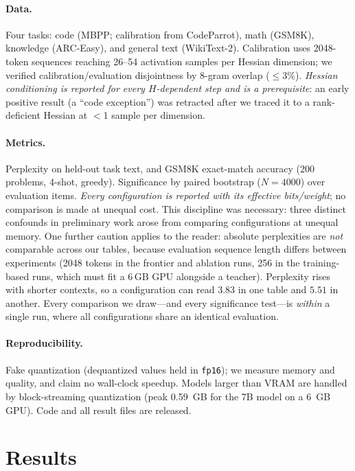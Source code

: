 \documentclass[manuscript, screen, review]{jair}
\newcommand{\bpw}{bits/weight}
\newcommand{\code}[1]{\texttt{#1}}
\begin{document}
\paragraph{Data.} Four tasks: code (MBPP; calibration from CodeParrot), math
(GSM8K), knowledge (ARC-Easy), and general text (WikiText-2). Calibration uses
2048-token sequences reaching 26--54 activation samples per Hessian dimension;
we verified calibration/evaluation disjointness by 8-gram overlap
($\le$3\%). \emph{Hessian conditioning is reported for every $H$-dependent step
and is a prerequisite}: an early positive result (a ``code exception'') was
retracted after we traced it to a rank-deficient Hessian at $<$1 sample per
dimension.

\paragraph{Metrics.} Perplexity on held-out task text, and GSM8K exact-match
accuracy (200 problems, 4-shot, greedy). Significance by paired bootstrap
($N{=}4000$) over evaluation items. \emph{Every configuration is reported with
its effective \bpw{}}; no comparison is made at unequal cost. This discipline
was necessary: three distinct confounds in preliminary work arose from
comparing configurations at unequal memory. One further caution applies to the
reader: absolute perplexities are \emph{not} comparable across our tables,
because evaluation sequence length differs between experiments (2048 tokens in
the frontier and ablation runs, 256 in the training-based runs, which must fit
a 6\,GB GPU alongside a teacher). Perplexity rises with shorter contexts, so a
configuration can read $3.83$ in one table and $5.51$ in another. Every
comparison we draw---and every significance test---is \emph{within} a single
run, where all configurations share an identical evaluation.

\paragraph{Reproducibility.} Fake quantization (dequantized values held in
\code{fp16}); we measure memory and quality, and claim no wall-clock speedup.
Models larger than VRAM are handled by block-streaming quantization (peak
0.59~GB for the 7B model on a 6~GB GPU). Code and all result files are
released.

\section{Results}
\label{sec:results}
\end{document}
